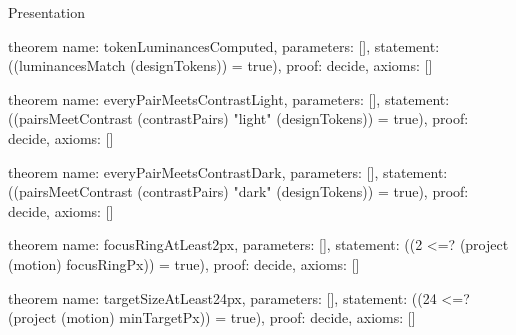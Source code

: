 \begin{lexlean}{Presentation}
\begin{semanticmodule}
theorem{
  name: tokenLuminancesComputed,
  parameters: [],
  statement: ((luminancesMatch (designTokens)) = true),
  proof: decide{},
  axioms: []
}

theorem{
  name: everyPairMeetsContrastLight,
  parameters: [],
  statement: ((pairsMeetContrast (contrastPairs) "light" (designTokens)) = true),
  proof: decide{},
  axioms: []
}

theorem{
  name: everyPairMeetsContrastDark,
  parameters: [],
  statement: ((pairsMeetContrast (contrastPairs) "dark" (designTokens)) = true),
  proof: decide{},
  axioms: []
}

theorem{
  name: focusRingAtLeast2px,
  parameters: [],
  statement: ((2 <=? (project (motion) focusRingPx)) = true),
  proof: decide{},
  axioms: []
}

theorem{
  name: targetSizeAtLeast24px,
  parameters: [],
  statement: ((24 <=? (project (motion) minTargetPx)) = true),
  proof: decide{},
  axioms: []
}
\end{semanticmodule}
\end{lexlean}
